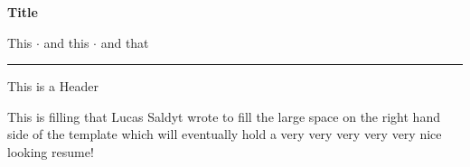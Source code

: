 \documentclass[letterpaper,11pt]{article}
\begin{document}
\begin{center}
\textbf{\Large Title}
\end{center}
\vspace{-1.5\baselineskip}
\begin{center}
    This $\cdot$ and this $\cdot$ and that
\end{center}
\vspace{-1.5\baselineskip}
\rule{1.0\textwidth}{1.5pt}
\vspace{0.1\baselineskip}
\newline
\begin{minipage}{0.1\textwidth}
    This is a Header
\end{minipage}
\hspace{0.04\textwidth}
\begin{minipage}{0.8\textwidth}
    This is filling that Lucas Saldyt wrote to fill the large space on the right hand side of the template which will eventually hold a very very very very very nice looking resume!
\end{minipage}
\end{document}

